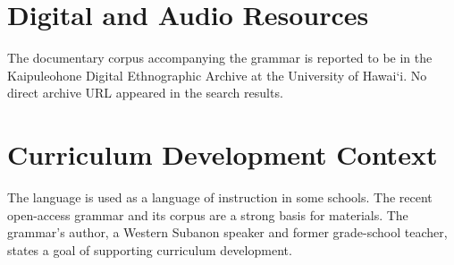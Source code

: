 \documentclass[12pt]{article}
\begin{document}
\section{Digital and Audio Resources}
The documentary corpus accompanying the grammar is reported to be in the Kaipuleohone Digital Ethnographic Archive at the University of Hawai\textquoteleft i. No direct archive URL appeared in the search results.

\section{Curriculum Development Context}
The language is used as a language of instruction in some schools. The recent open-access grammar and its corpus are a strong basis for materials. The grammar's author, a Western Subanon speaker and former grade-school teacher, states a goal of supporting curriculum development.
\end{document}
